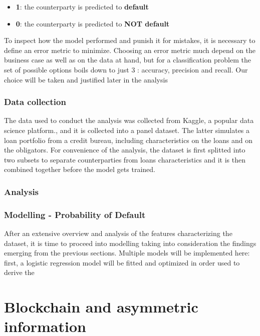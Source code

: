 \documentclass[a4paper,12pt]{article}
\begin{document}
        \begin{itemize}
            \item \textbf{1}: the counterparty is predicted to \textbf{default} 
            \item \textbf{0}: the counterparty is predicted to \textbf{NOT default} 
        \end{itemize} 
    To inspect how the model performed and punish it for mistakes, it is necessary to define an error metric to minimize. Choosing an error metric
    much depend on the business case as well as on the data at hand, but for a classification problem the set of possible options boils down to just 3 : accuracy, precision and recall. 
    Our choice will be taken and justified later in the analysis

    \subsubsection*{Data collection}
    The data used to conduct the analysis was collected from Kaggle, a popular data science platform., and it is collected into a panel dataset. The latter simulates a loan portfolio from a 
    credit bureau, including characteristics on the loans and on the obligators. For convenience of the analysis, the dataset is first splitted into two 
    subsets to separate counterparties from loans characteristics and it is then combined together before the model gets trained.

    \subsubsection*{Analysis}
    

    \subsubsection*{Modelling - Probability of Default}
    After an extensive overview and analysis of the features characterizing the dataset, it is time to proceed into modelling taking into consideration the 
    findings emerging from the previous sections. Multiple models will be implemented here: first, a logistic regression model will be fitted and optimized in order 
     used to derive the   



    \pagebreak
    \section{Blockchain and asymmetric information}
\end{document}
